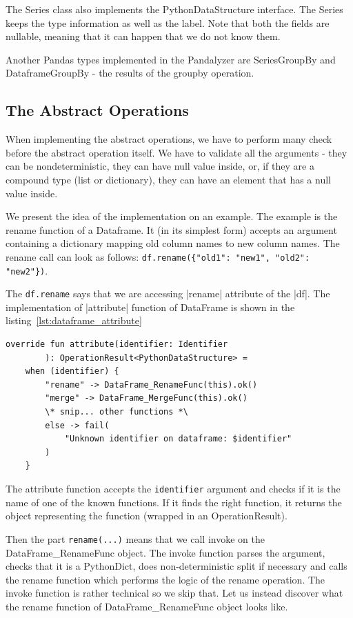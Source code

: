 The Series class also implements the PythonDataStructure interface.
The Series keeps the type information as well as the label.
Note that both the fields are nullable, meaning that it can happen that we do not know them.

Another Pandas types implemented in the Pandalyzer are SeriesGroupBy and DataframeGroupBy - the results of the groupby
operation.

\subsection{The Abstract Operations}\label{subsec:the-abstract-operations}

When implementing the abstract operations, we have to perform many check before the abstract operation itself.
We have to validate all the arguments - they can be nondeterministic, they can have null value inside, or, if they are
a compound type (list or dictionary), they can have an element that has a null value inside.

We present the idea of the implementation on an example.
The example is the rename function of a Dataframe.
It (in its simplest form) accepts an argument containing a dictionary mapping old column names to new column names.
The rename call can look as follows: \verb|df.rename({"old1": "new1", "old2": "new2"})|.

The \verb|df.rename| says that we are accessing |rename| attribute of the |df|.
The implementation of |attribute| function of DataFrame is shown in the listing~\ref{lst:dataframe_attribute}

\begin{lstlisting}[caption=Snippet of attribute function of Dataframe, label={lst:dataframe_attribute}, captionpos=b]
override fun attribute(identifier: Identifier
        ): OperationResult<PythonDataStructure> =
    when (identifier) {
        "rename" -> DataFrame_RenameFunc(this).ok()
        "merge" -> DataFrame_MergeFunc(this).ok()
        \* snip... other functions *\
        else -> fail(
            "Unknown identifier on dataframe: $identifier"
        )
    }
\end{lstlisting}

The attribute function accepts the \verb|identifier| argument and checks if it is the name of one of the known functions.
If it finds the right function, it returns the object representing the function (wrapped in an OperationResult).

Then the part \verb|rename(...)| means that we call invoke on the \\ DataFrame\_RenameFunc object.
The invoke function parses the argument, checks that it is a PythonDict, does non-deterministic split if necessary and
calls the rename function which performs the logic of the rename operation.
The invoke function is rather technical so we skip that.
Let us instead discover what the rename function of DataFrame\_RenameFunc object looks like.


